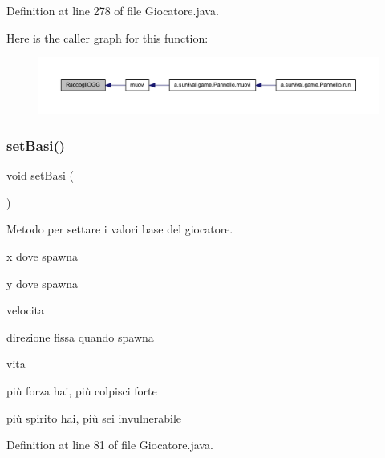 Definition at line 278 of file Giocatore.\+java.

Here is the caller graph for this function\+:
\nopagebreak
\begin{figure}[H]
\begin{center}
\leavevmode
\includegraphics[width=350pt]{class_entita_1_1_giocatore_a9ba65e7d25928d62218cf14bee3c0273_icgraph}
\end{center}
\end{figure}
\mbox{\label{class_entita_1_1_giocatore_a38a75be5807f155ff640bfa73518421d}} 
\subsubsection{\texorpdfstring{set\+Basi()}{setBasi()}}
{\footnotesize\ttfamily void set\+Basi (\begin{DoxyParamCaption}{ }\end{DoxyParamCaption})}



Metodo per settare i valori base del giocatore. 

x dove spawna

y dove spawna

velocita

direzione fissa quando spawna

vita

più forza hai, più colpisci forte

più spirito hai, più sei invulnerabile

Definition at line 81 of file Giocatore.\+java.

